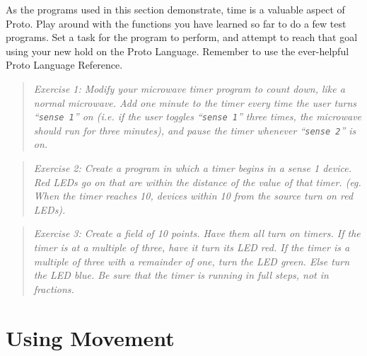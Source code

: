 \documentclass{article}
\newcommand\problem[1]{\begin{quote}{\em #1}\end{quote}}
\newcommand\qvar[1]{``{\tt #1}''}
\begin{document}
As the programs used in this section demonstrate, time is a valuable
aspect of Proto. Play around with the functions you have learned so
far to do a few test programs. Set a task for the program to perform,
and attempt to reach that goal using your new hold on the Proto
Language. Remember to use the ever-helpful Proto Language Reference.
	
\problem{Exercise 1: Modify your microwave timer program to count
  down, like a normal microwave.  Add one minute to the timer every
  time the user turns \qvar{sense 1} on (i.e. if the user toggles
  \qvar{sense 1} three times, the microwave should run for three
  minutes), and pause the timer whenever \qvar{sense 2} is on.}

\problem{Exercise 2: Create a program in which a timer begins in a
  sense 1 device. Red LEDs go on that are within the distance of the
  value of that timer. (eg. When the timer reaches 10, devices within
  10 from the source turn on red LEDs).}

\problem{Exercise 3: Create a field of 10 points. Have them all turn
  on timers. If the timer is at a multiple of three, have it turn its
  LED red. If the timer is a multiple of three with a remainder of
  one, turn the LED green. Else turn the LED blue. Be sure that the
  timer is running in full steps, not in fractions.}


\section{Using Movement}
\end{document}
